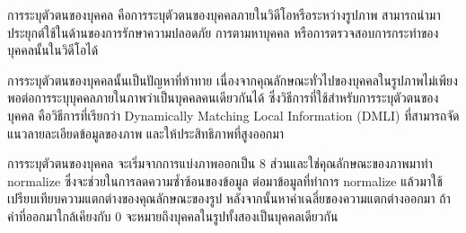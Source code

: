 การระบุตัวตนของบุคคล คือการระบุตัวตนของบุคคลภายในวิดีโอหรือระหว่างรูปภาพ สามารถนำมาประยุกต์ใช้ในด้านของการรักษาความปลอดภัย การตามหาบุคคล หรือการตรวจสอบการกระทำของบุคคลนั้นในวิดีโอได้

การระบุตัวตนของบุคคลนั้นเป็นปัญหาที่ท้าทาย เนื่องจากคุณลักษณะทั่วไปของบุคคลในรูปภาพไม่เพียงพอต่อการระบุบุคคลภายในภาพว่าเป็นบุคคลคนเดียวกันได้ 
ซึ่งวิธีการที่ใช้สำหรับการระบุตัวตนของบุคคล คือวิธีการที่เรียกว่า Dynamically Matching Local Information (DMLI) ที่สามารถจัดแนวลายละเอียดข้อมูลของภาพ และให้ประสิทธิภาพที่สูงออกมา

การระบุตัวตนของบุคคล จะเริ่มจากการแบ่งภาพออกเป็น 8 ส่วนและใช่คุณลักษณะของภาพมาทำ normalize ซึ่งจะช่วยในการลดความซ้ำซ้อนของข้อมูล ต่อมาข้อมูลที่ทำการ normalize แล้วมาใช้เปรียบเทียบความแตกต่างของคุณลักษณะของรูป
หลังจากนั้นหาค่าเฉลี่ยของความแตกต่างออกมา ถ้าค่าที่ออกมาใกล้เคียงกับ 0 จะหมายถึงบุคคลในรูปทั้งสองเป็นบุคคลเดียวกัน